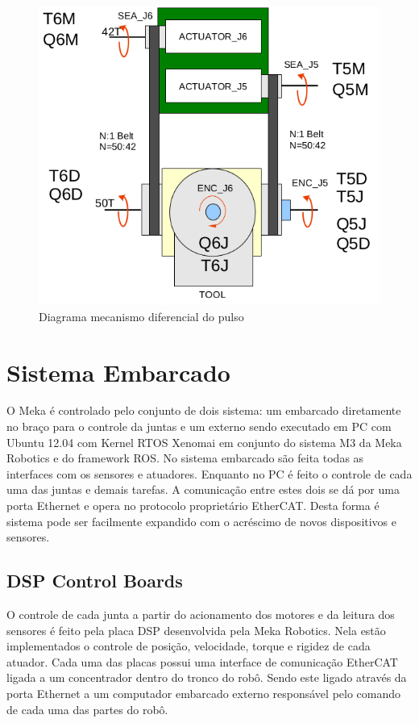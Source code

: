 \begin{figure}[H]
    \centering
    \includegraphics[width = 0.6\linewidth]{tex/figs/meka_wrist.png}
    \caption{Diagrama mecanismo diferencial do pulso \cite{mekartfd}}
    \label{fig:meka-wrist}
\end{figure}


\section{Sistema Embarcado}

O Meka é controlado pelo conjunto de dois sistema: um embarcado diretamente no braço para o controle da juntas e um externo sendo executado em PC com Ubuntu 12.04 com Kernel RTOS Xenomai em conjunto do sistema M3 da Meka Robotics e do framework ROS. No sistema embarcado são feita todas as interfaces com os sensores e atuadores. Enquanto no PC é feito o controle de cada uma das juntas e demais tarefas. A comunicação entre estes dois se dá por uma porta Ethernet e opera no protocolo proprietário EtherCAT. Desta forma é sistema pode ser facilmente expandido com o acréscimo de novos dispositivos e sensores.

\subsection{DSP Control Boards}
O controle de cada junta a partir do acionamento dos motores e da leitura dos sensores é feito pela placa DSP desenvolvida pela Meka Robotics. Nela estão implementados o controle de posição, velocidade, torque e rigidez de cada atuador. Cada uma das placas possui uma interface de comunicação EtherCAT ligada a um concentrador dentro do tronco do robô. Sendo este ligado através da porta Ethernet a um computador embarcado externo responsável pelo comando de cada uma das partes do robô.

